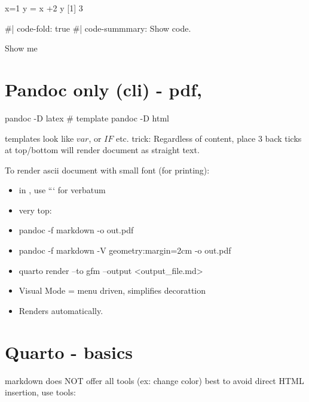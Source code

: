 \documentclass[
]{report}
\newenvironment{Shaded}{\begin{snugshade}}{\end{snugshade}}
\newcommand{\CommentTok}[1]{\textcolor[rgb]{0.37,0.37,0.37}{#1}}
\newcommand{\DecValTok}[1]{\textcolor[rgb]{0.68,0.00,0.00}{#1}}
\newcommand{\NormalTok}[1]{\textcolor[rgb]{0.00,0.23,0.31}{#1}}
\newcommand{\OtherTok}[1]{\textcolor[rgb]{0.00,0.23,0.31}{#1}}
\newcommand{\SpecialCharTok}[1]{\textcolor[rgb]{0.37,0.37,0.37}{#1}}
\begin{document}
\begin{Shaded}
\begin{Highlighting}[]
\NormalTok{x}\OtherTok{=}\DecValTok{1}
\NormalTok{y }\OtherTok{=}\NormalTok{ x }\SpecialCharTok{+}\DecValTok{2}
\NormalTok{y}
\NormalTok{[}\DecValTok{1}\NormalTok{] }\DecValTok{3}
\end{Highlighting}
\end{Shaded}

\begin{Shaded}
\begin{Highlighting}[]
\CommentTok{\#| code{-}fold: true}
\CommentTok{\#| code{-}summmary: Show code.}

\NormalTok{Show me}
\end{Highlighting}
\end{Shaded}

\section{Pandoc only (cli) - pdf,}\label{pandoc-only-cli---pdf}

pandoc -D latex \# template pandoc -D html

templates look like \(var\), or \(IF\) etc. trick: Regardless of
content, place 3 back ticks at top/bottom will render document as
straight text.

\footnotesize

To render ascii document with small font (for printing):

\begin{itemize}
\item
  in , use ``` for verbatum
\item
  very top: \footenotesize
\item
  pandoc -f markdown -o out.pdf
\item
  pandoc -f markdown -V geometry:margin=2cm -o out.pdf
\item
  quarto render --to gfm --output
  \textless output\_file.md\textgreater{}
\item
  Visual Mode = menu driven, simplifies decorattion
\item
  Renders automatically.
\end{itemize}

\section{Quarto - basics}\label{quarto---basics}

markdown does NOT offer all tools (ex: change color) best to avoid
direct HTML insertion, use tools:
\end{document}

